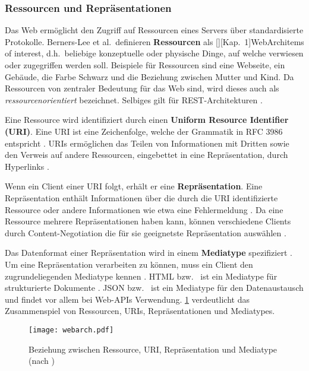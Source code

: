 \subsubsection{Ressourcen und Repräsentationen}
Das Web ermöglicht den Zugriff auf Ressourcen eines Servers über standardisierte Protokolle. Berners-Lee et al.\ definieren \textbf{Ressourcen} als [][Kap.~1]{WebArch}{items of interest}, d.h.\ beliebige konzeptuelle oder physische Dinge, auf welche verwiesen oder zugegriffen werden soll. Beispiele für Ressourcen sind eine Webseite, ein Gebäude, die Farbe Schwarz und die Beziehung zwischen Mutter und Kind. Da Ressourcen von zentraler Bedeutung für das Web sind, wird dieses auch als \emph{ressourcenorientiert} bezeichnet. Selbiges gilt für REST-Architekturen \autocite[S.~4]{Webber2010}.

Eine Ressource wird identifiziert durch einen \textbf{Uniform Resource Identifier (URI)}. Eine URI ist eine Zeichenfolge, welche der Grammatik in RFC 3986 entspricht \autocite{RFC3986}. URIs ermöglichen das Teilen von Informationen mit Dritten \autocite[Kap.~2]{WebArch} sowie den Verweis auf andere Ressourcen, eingebettet in eine Repräsentation, durch Hyperlinks \autocite[Abs.~4.4]{WebArch}.

Wenn ein Client einer URI folgt, erhält er eine \textbf{Repräsentation}. Eine Repräsentation enthält Informationen über die durch die URI identifizierte Ressource \autocite[Abs.~3.2]{WebArch} oder andere Informationen wie etwa eine Fehlermeldung \autocite[S.~91]{Fielding2000}. Da eine Ressource mehrere Repräsentationen haben kann, können verschiedene Clients durch Content-Negotiation die für sie geeignetste Repräsentation auswählen \autocite[Abs.~3.4]{RFC7231}.

Das Datenformat einer Repräsentation wird in einem \textbf{Mediatype} spezifiziert \autocite{RFC2046}. Um eine Repräsentation verarbeiten zu können, muss ein Client den zugrundeliegenden Mediatype kennen \autocite[S.~358]{Richardson2013}. HTML bzw.\  ist ein Mediatype für strukturierte Dokumente \autocite{RFC2854}. JSON bzw.\  ist ein Mediatype für den Datenaustausch \autocite{RFC8259} und findet vor allem bei Web-APIs Verwendung. \cref{fig:web-architecture} verdeutlicht das Zusammenspiel von Ressourcen, URIs, Repräsentationen und Mediatypes.

\begin{figure}
    \centering
    \texttt{[image: webarch.pdf]}
    \caption{Beziehung zwischen Ressource, URI, Repräsentation und Mediatype (nach \autocite[Kap.~1]{WebArch})}
    \label{fig:web-architecture} %
\end{figure}

